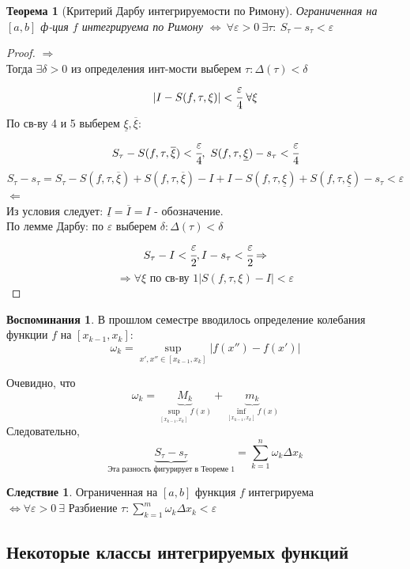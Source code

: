 \documentclass[a4paper]{article}
\newtheorem{theorem}{Теорема}
\theoremstyle{definition}
\newtheorem*{memories}{Воспоминания}
\newtheorem*{consequence*}{Следствие}
\newcommand\abs[1]{%
\mbox{$| #1 |$}}
\numberwithin{theorem}{subsection}
\numberwithin{lemma}{subsection}
\numberwithin{definition}{subsection}
\numberwithin{comment*}{subsection}
\numberwithin{consequence}{subsection}
\numberwithin{property}{subsection}
\begin{document}
\begin{theorem}[Критерий Дарбу интегрируемости по Римону]\label{th:krDarbu}
 Ограниченная на $[a,b]$ ф-ция $f$ интегрируема по Римону $\Leftrightarrow \ \forall{\varepsilon}>0\ \exists{\tau}:\ S_\tau - s_\tau < \varepsilon$
\end{theorem}
\begin{proof}
 $\Rightarrow$\\
 Тогда $\exists{\delta}> 0 $ из определения инт-мости выберем $\tau: \Delta(\tau)< \delta \  $
 $$ \abs{I - S(f, \tau, \xi)} <\cfrac{\varepsilon}{4}\ \forall{\xi} $$
 По св-ву 4 и 5 выберем $\underline{\xi}, \overline{\xi}$:
 $$ S_\tau - S(f,\tau, \overline{\xi}) < \cfrac{\varepsilon}{4}, \ S(f, \tau, \underline{\xi})- s_\tau<\cfrac{\varepsilon}{4} $$
 $$S_\tau-s_\tau = S_\tau - S(f, \tau, \overline{\xi}) + S(f,\tau, \overline{\xi})- I + I - S(f,\tau, \underline{\xi}) +S(f,\tau, \underline{\xi}) -s_\tau < \varepsilon  $$
 $ \Leftarrow $\\
 Из условия следует: $\underline{I} = \overline{I} = I$ - обозначение. \\
 По лемме Дарбу: по $\varepsilon $ выберем $\delta: \Delta(\tau) < \delta$\\
 $$S_\tau - I < \cfrac{\varepsilon}{2}, I- s_\tau < \cfrac{\varepsilon}{2} \Rightarrow $$
 $$ \Rightarrow \forall{\xi} \text{ по св-ву 1} \abs{S(f,\tau,\xi) -I}<\varepsilon $$
\end{proof}
\begin{memories}
 В прошлом семестре вводилось определение колебания функции $f$ на $[x_{k-1}, x_k]$:
 $$ \omega_k = \sup_{x',x'' \in [x_{k-1}, x_k]} \abs{f(x'')-f(x')} $$
\end{memories}
Очевидно, что
$$ \omega_k = \underbrace{M_k}_{\sup_{[x_{k-1}, x_k]} f(x)} + \underbrace{m_k}_{\inf_{[x_{k-1}, x_k]} f(x)} $$
Следовательно,
$$ \underbrace{S_\tau - s_\tau}_{\text{Эта разность фигурирует в Теореме 1}} = \sum_{k=1}^{n}{\omega_k \Delta x_k} $$
\begin{consequence*}
 Ограниченная на $[a,b]$ функция $f$ интегрируема\\ $\Leftrightarrow \forall{\varepsilon} > 0 \ \exists{\text{ Разбиение }\tau}: \sum_{k=1}^{m}{\omega_k \Delta x_k} < \varepsilon$
\end{consequence*}
\subsection{Некоторые классы интегрируемых функций}
\end{document}
